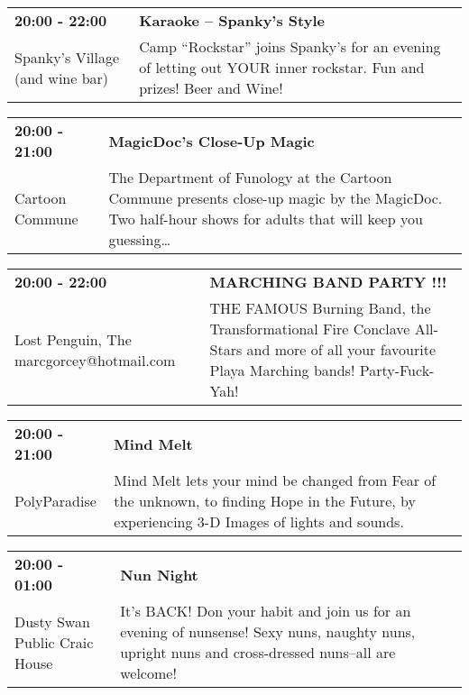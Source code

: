 \begin{tabular}{ p{1in} p{2.2in} }
    \textbf{20:00 - 22:00} & \textbf{Karaoke -- Spanky's Style} \\
    Spanky's Village (and wine bar) \newline  & Camp ``Rockstar'' joins Spanky's for an evening of letting out YOUR inner rockstar.  Fun and prizes!   Beer and Wine! \\
    \hline 
\end{tabular}
    
\begin{tabular}{ p{1in} p{2.2in} }
    \textbf{20:00 - 21:00} & \textbf{MagicDoc's Close-Up Magic } \\
    Cartoon Commune \newline  & The Department of Funology at the Cartoon Commune presents close-up magic by the MagicDoc. Two half-hour shows for adults that will keep you guessing\ldots \\
    \hline 
\end{tabular}
    
\begin{tabular}{ p{1in} p{2.2in} }
    \textbf{20:00 - 22:00} & \textbf{MARCHING BAND PARTY !!!} \\
    Lost Penguin, The \newline marcgorcey@hotmail.com & THE FAMOUS Burning Band, the Transformational Fire Conclave All-Stars and more of all your favourite Playa Marching bands! Party-Fuck-Yah! \\
    \hline 
\end{tabular}
    
\begin{tabular}{ p{1in} p{2.2in} }
    \textbf{20:00 - 21:00} & \textbf{Mind Melt } \\
    PolyParadise \newline  & Mind Melt lets your mind be changed from Fear of the unknown, to finding Hope in the Future, by experiencing 3-D Images of lights and sounds. \\
    \hline 
\end{tabular}
    
\begin{tabular}{ p{1in} p{2.2in} }
    \textbf{20:00 - 01:00} & \textbf{Nun Night} \\
    Dusty Swan Public Craic House \newline  & It's BACK!  Don your habit and join us for an evening of nunsense! Sexy nuns, naughty nuns, upright nuns and cross-dressed nuns--all are welcome! \\
    \hline 
\end{tabular}
    
